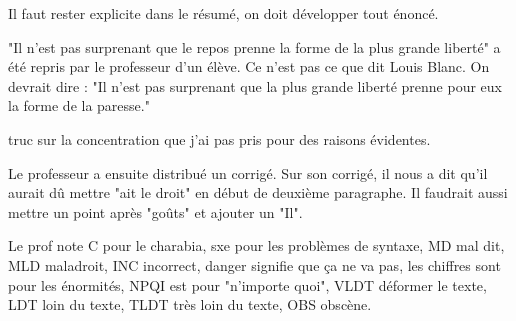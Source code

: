 \documentclass[a4paper,12pt]{book}
\begin{document}
\par Il faut rester explicite dans le résumé, on doit développer tout énoncé. \par "Il n'est pas surprenant que le repos prenne la forme de la plus grande liberté" a été repris par le professeur d'un élève. Ce n'est pas ce que dit Louis Blanc. On devrait dire : "Il n'est pas surprenant que la plus grande liberté prenne pour eux la forme de la paresse." \par truc sur la concentration que j'ai pas pris pour des raisons évidentes.
\par Le professeur a ensuite distribué un corrigé. Sur son corrigé, il nous a dit qu'il aurait dû mettre "ait le droit" en début de deuxième paragraphe. Il faudrait aussi mettre un point après "goûts" et ajouter un "Il". \par Le prof note C pour le charabia, sxe pour les problèmes de syntaxe, MD mal dit, MLD maladroit, INC incorrect, danger signifie que ça ne va pas, les chiffres sont pour les énormités, NPQI est pour "n'importe quoi", VLDT déformer le texte, LDT loin du texte, TLDT très loin du texte, OBS obscène.
\end{document}
